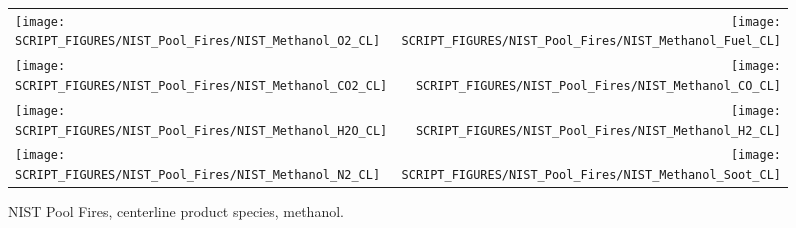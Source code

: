 \begin{figure}[p]
\begin{tabular*}{\textwidth}{l@{\extracolsep{\fill}}r}
\texttt{[image: SCRIPT\_FIGURES/NIST\_Pool\_Fires/NIST\_Methanol\_O2\_CL]} &
\texttt{[image: SCRIPT\_FIGURES/NIST\_Pool\_Fires/NIST\_Methanol\_Fuel\_CL]} \\
\texttt{[image: SCRIPT\_FIGURES/NIST\_Pool\_Fires/NIST\_Methanol\_CO2\_CL]} &
\texttt{[image: SCRIPT\_FIGURES/NIST\_Pool\_Fires/NIST\_Methanol\_CO\_CL]}    \\
\texttt{[image: SCRIPT\_FIGURES/NIST\_Pool\_Fires/NIST\_Methanol\_H2O\_CL]} &
\texttt{[image: SCRIPT\_FIGURES/NIST\_Pool\_Fires/NIST\_Methanol\_H2\_CL]} \\
\texttt{[image: SCRIPT\_FIGURES/NIST\_Pool\_Fires/NIST\_Methanol\_N2\_CL]} &
\texttt{[image: SCRIPT\_FIGURES/NIST\_Pool\_Fires/NIST\_Methanol\_Soot\_CL]}
\end{tabular*}
\caption[NIST Pool Fires, centerline product species, methanol]{NIST Pool Fires, centerline product species, methanol.}
\label{NIST_Pool_Fires_Methanol}
\end{figure}

\clearpage

%
%
%
%

